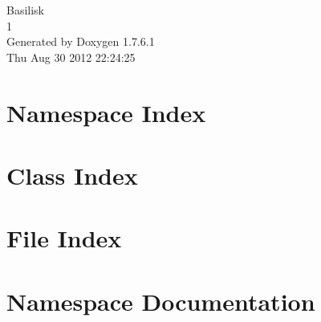 \documentclass[a4paper]{book}
\begin{document}
\hypersetup{pageanchor=false,citecolor=blue}
\begin{titlepage}
\vspace*{7cm}
\begin{center}
{\Large \-Basilisk \\[1ex]\large 1 }\\
\vspace*{1cm}
{\large \-Generated by Doxygen 1.7.6.1}\\
\vspace*{0.5cm}
{\small Thu Aug 30 2012 22:24:25}\\
\end{center}
\end{titlepage}
\clearemptydoublepage
{}
\tableofcontents
\clearemptydoublepage
{}
\hypersetup{pageanchor=true,citecolor=blue}
\chapter{\-Namespace \-Index}

\chapter{\-Class \-Index}

\chapter{\-File \-Index}

\chapter{\-Namespace \-Documentation}



































\end{document}
